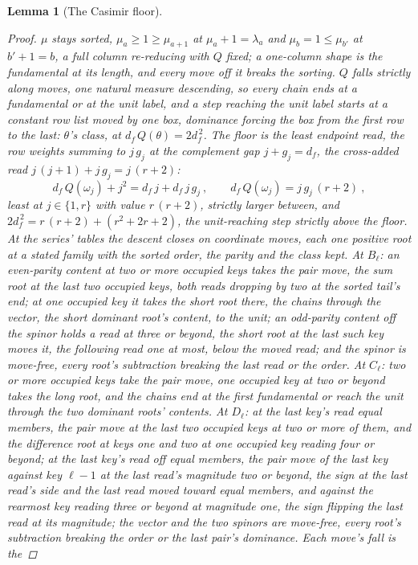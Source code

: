 \documentclass[11pt]{article}
\newtheorem{lemma}{Lemma}
\theoremstyle{definition}
\begin{document}
\begin{lemma}[The Casimir floor]
\begin{proof}
$\mu$ stays sorted, $\mu_a\ge1\ge\mu_{a+1}$ at $\mu_a+1=\lambda_a$
and $\mu_b=1\le\mu_{b'}$ at $b'+1=b$, a full column re-reducing with $Q$ fixed; a one-column
shape is the fundamental at its length, and every move
off it breaks the sorting. $Q$ falls strictly along moves, one
natural measure descending, so every chain ends at a fundamental
or at the unit label, and a step
reaching the unit label starts at a constant row list moved by one
box, dominance forcing the box from the first row to the last:
$\theta$'s class, at
$d_f\,Q(\theta)=2d_f^{\,2}$. The floor is the least endpoint
read, the row weights summing to $j\,g_j$ at the complement gap
$j+g_j=d_f$, the cross-added read $j\,(j+1)+j\,g_j=j\,(r+2)$:
\[
d_f\,Q(\omega_j)+j^2=d_f\,j+d_f\,j\,g_j\ ,
\qquad
d_f\,Q(\omega_j)=j\,g_j\,(r+2)\ ,
\]
least at $j\in\{1,r\}$ with value $r\,(r+2)$, strictly larger between,
and $2d_f^{\,2}=r\,(r+2)+(r^2+2r+2)$, the unit-reaching step
strictly above the floor. At the series' tables the descent
closes on coordinate moves, each one positive root at a stated
family with the sorted order, the parity and the class kept. At
$B_\ell$: an even-parity content at two or more occupied keys
takes the pair move, the sum root at the last two occupied keys,
both reads dropping by two at the sorted tail's end; at one
occupied key it takes the short root there, the chains through
the vector, the short dominant root's content, to the unit; an
odd-parity content off the spinor holds a read at three or
beyond, the short root at the last such key moves it, the
following read one at most, below the moved read; and the spinor
is move-free, every root's subtraction breaking the last read or
the order. At $C_\ell$: two or more occupied keys take the pair
move, one occupied key at two or beyond takes the long root, and
the chains end at the first fundamental or reach the unit
through the two dominant roots' contents. At $D_\ell$: at the
last key's read equal members, the pair move at the last two
occupied keys at two or more of them, and the difference root at
keys one and two at one occupied key reading four or beyond; at
the last key's read off equal members, the pair move of the last
key against key $\ell{-}1$ at the last read's magnitude two or
beyond, the sign at the last read's side and the last read moved
toward equal members, and against the rearmost key reading three
or beyond at magnitude one, the sign flipping the last read at
its magnitude; the vector and the two spinors are
move-free, every root's subtraction breaking the order or the
last pair's dominance. Each move's fall is the

\end{proof}
\end{lemma}
\end{document}

